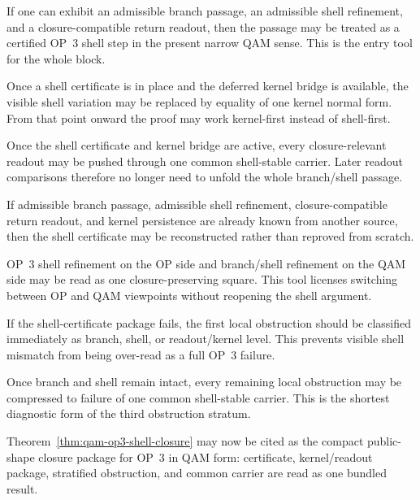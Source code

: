 \begin{description}[leftmargin=2.2em,style=nextline]
 \item[Shell-certificate tool.]\label{tool:qam-shell-certificate}
 If one can exhibit an admissible branch passage, an admissible shell refinement, and a closure-compatible return readout, then the passage may be treated as a certified OP~3 shell step in the present narrow QAM sense. This is the entry tool for the whole block.

 \item[Kernel-persistence tool.]\label{tool:qam-kernel-persistence}
 Once a shell certificate is in place and the deferred kernel bridge is available, the visible shell variation may be replaced by equality of one kernel normal form. From that point onward the proof may work kernel-first instead of shell-first.

 \item[Shell-stable readout tool.]\label{tool:qam-shell-stable-readout}
 Once the shell certificate and kernel bridge are active, every closure-relevant readout may be pushed through one common shell-stable carrier. Later readout comparisons therefore no longer need to unfold the whole branch/shell passage.

 \item[Converse reconstruction tool.]\label{tool:qam-shell-converse}
 If admissible branch passage, admissible shell refinement, closure-compatible return readout, and kernel persistence are already known from another source, then the shell certificate may be reconstructed rather than reproved from scratch.

 \item[Commuting-square tool.]\label{tool:qam-shell-commuting-square}
 OP~3 shell refinement on the OP side and branch/shell refinement on the QAM side may be read as one closure-preserving square. This tool licenses switching between OP and QAM viewpoints without reopening the shell argument.

 \item[Obstruction-stratification tool.]\label{tool:qam-shell-obstruction-stratification}
 If the shell-certificate package fails, the first local obstruction should be classified immediately as branch, shell, or readout/kernel level. This prevents visible shell mismatch from being over-read as a full OP~3 failure.

 \item[Carrier-compression tool.]\label{tool:qam-shell-carrier-compression}
 Once branch and shell remain intact, every remaining local obstruction may be compressed to failure of one common shell-stable carrier. This is the shortest diagnostic form of the third obstruction stratum.

 \item[Bundled OP~3 closure tool.]\label{tool:qam-op3-shell-closure}
 Theorem~\ref{thm:qam-op3-shell-closure} may now be cited as the compact public-shape closure package for OP~3 in QAM form: certificate, kernel/readout package, stratified obstruction, and common carrier are read as one bundled result.
\end{description}

